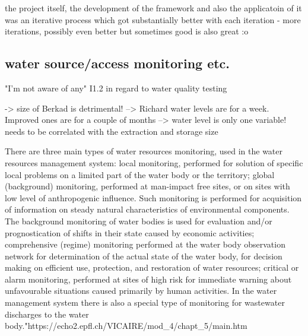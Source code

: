 the project itself, the development of the framework and also the applicatoin of it was an iterative process which got substantially better with each iteration - more iterations, possibly even better but sometimes good is also great :o

\subsection{water source/access monitoring etc.}

"I'm not aware of any" I1.2 in regard to water quality testing

-> size of Berkad is detrimental! --> Richard water levels are for a week. Improved ones are for a couple of months --> water level is only one variable! needs to be correlated with the extraction and storage size


There are three main types of water resources monitoring, used in the water resources management system:
local monitoring, performed for solution of specific local problems on a limited part of the water body or the territory;
global (background) monitoring, performed at man-impact free sites, or on sites with low level of anthropogenic influence. Such monitoring is performed for acquisition of information on steady natural characteristics of environmental components. The background monitoring of water bodies is used for evaluation and/or prognostication of shifts in their state caused by economic activities;
comprehensive (regime) monitoring performed at the water body observation network for determination of the actual state of the water body, for decision making on efficient use, protection, and restoration of water resources;
critical or alarm monitoring, performed at sites of high risk for immediate warning about unfavourable situations caused primarily by human activities.
In the water management system there is also a special type of monitoring for wastewater discharges to the water body."https://echo2.epfl.ch/VICAIRE/mod_4/chapt_5/main.htm

